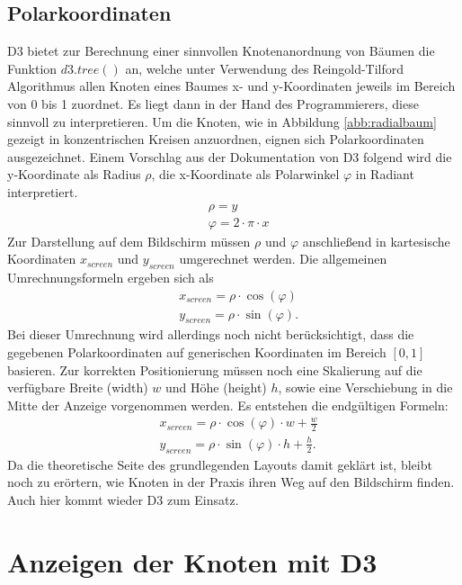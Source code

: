 \subsection{Polarkoordinaten}
D3 bietet zur Berechnung einer sinnvollen Knotenanordnung von Bäumen die Funktion $d3.tree()$ an, welche unter Verwendung des Reingold-Tilford Algorithmus  allen Knoten eines Baumes x- und y-Koordinaten jeweils im Bereich von 0 bis 1 zuordnet. Es liegt dann in der Hand des Programmierers, diese sinnvoll zu interpretieren. Um die Knoten, wie in Abbildung \ref{abb:radialbaum} gezeigt in konzentrischen Kreisen anzuordnen, eignen sich Polarkoordinaten ausgezeichnet. Einem Vorschlag aus der Dokumentation von D3 folgend  wird die y-Koordinate als Radius $\rho$, die x-Koordinate als Polarwinkel $\varphi$ in Radiant interpretiert. 
\begin{align*}
&\rho = y\\
&\varphi = 2 \cdot \pi \cdot x
\end{align*}
Zur Darstellung auf dem Bildschirm müssen $\rho$ und $\varphi$ anschließend in kartesische Koordinaten $x_{screen}$ und $y_{screen}$ umgerechnet werden. Die allgemeinen Umrechnungsformeln ergeben sich als
\begin{align*}
&x_{screen} = \rho \cdot \cos (\varphi)\\
&y_{screen} = \rho \cdot \sin (\varphi).
\end{align*}
Bei dieser Umrechnung wird allerdings noch nicht berücksichtigt, dass die gegebenen Polarkoordinaten auf generischen Koordinaten im Bereich $[0,1]$ basieren. Zur korrekten Positionierung müssen noch eine Skalierung auf die verfügbare Breite (width) $w$ und Höhe (height) $h$, sowie eine Verschiebung in die Mitte der Anzeige vorgenommen werden. Es entstehen die endgültigen Formeln:
\begin{align}
&x_{screen} = \rho \cdot \cos (\varphi) \cdot w + \frac{w}{2} \label{eq:polkarthx}\\
&y_{screen} = \rho \cdot \sin (\varphi) \cdot h + \frac{h}{2}.\label{eq:polkarthy}
\end{align}
Da die theoretische Seite des grundlegenden Layouts damit geklärt ist, bleibt noch zu erörtern, wie Knoten in der Praxis ihren Weg auf den Bildschirm finden. Auch hier kommt wieder D3 zum Einsatz.

\section{Anzeigen der Knoten mit D3}

